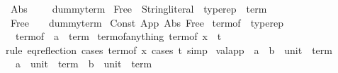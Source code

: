 \begin{isabellebody}
\ \ {\isachardoublequoteopen}Abs\ {\isacharunderscore}{\kern0pt}\ {\isacharunderscore}{\kern0pt}\ {\isacharunderscore}{\kern0pt}\ {\isacharequal}{\kern0pt}\ dummy{\isacharunderscore}{\kern0pt}term{\isachardoublequoteclose}\isanewline
\isanewline
{}\isamarkupfalse%
\ Free\ {\isacharcolon}{\kern0pt}{\isacharcolon}{\kern0pt}\ {\isachardoublequoteopen}String{\isachardot}{\kern0pt}literal\ {\isasymRightarrow}\ typerep\ {\isasymRightarrow}\ term{\isachardoublequoteclose}\ \isanewline
\ \ {\isachardoublequoteopen}Free\ {\isacharunderscore}{\kern0pt}\ {\isacharunderscore}{\kern0pt}\ {\isacharequal}{\kern0pt}\ dummy{\isacharunderscore}{\kern0pt}term{\isachardoublequoteclose}\isanewline
\isanewline
{}\isamarkupfalse%
\ Const\ App\ Abs\ Free\isanewline
\isanewline
{}\isamarkupfalse%
\ term{\isacharunderscore}{\kern0pt}of\ {\isacharequal}{\kern0pt}\ typerep\ {\isacharplus}{\kern0pt}\isanewline
\ \ \ term{\isacharunderscore}{\kern0pt}of\ {\isacharcolon}{\kern0pt}{\isacharcolon}{\kern0pt}\ {\isachardoublequoteopen}{\isacharprime}{\kern0pt}a\ {\isasymRightarrow}\ term{\isachardoublequoteclose}\isanewline
\isanewline
{}\isamarkupfalse%
\ term{\isacharunderscore}{\kern0pt}of{\isacharunderscore}{\kern0pt}anything{\isacharcolon}{\kern0pt}\ {\isachardoublequoteopen}term{\isacharunderscore}{\kern0pt}of\ x\ {\isasymequiv}\ t{\isachardoublequoteclose}\isanewline
%
\isadelimproof
\ \ %
\endisadelimproof
%
\isatagproof
{}\isamarkupfalse%
\ {\isacharparenleft}{\kern0pt}rule\ eq{\isacharunderscore}{\kern0pt}reflection{\isacharparenright}{\kern0pt}\ {\isacharparenleft}{\kern0pt}cases\ {\isachardoublequoteopen}term{\isacharunderscore}{\kern0pt}of\ x{\isachardoublequoteclose}{\isacharcomma}{\kern0pt}\ cases\ t{\isacharcomma}{\kern0pt}\ simp{\isacharparenright}{\kern0pt}%
\endisatagproof
{\isafoldproof}%
%
\isadelimproof
\isanewline
%
\endisadelimproof
\isanewline
{}\isamarkupfalse%
\ valapp\ {\isacharcolon}{\kern0pt}{\isacharcolon}{\kern0pt}\ {\isachardoublequoteopen}{\isacharparenleft}{\kern0pt}{\isacharprime}{\kern0pt}a\ {\isasymRightarrow}\ {\isacharprime}{\kern0pt}b{\isacharparenright}{\kern0pt}\ {\isasymtimes}\ {\isacharparenleft}{\kern0pt}unit\ {\isasymRightarrow}\ term{\isacharparenright}{\kern0pt}\isanewline
\ \ {\isasymRightarrow}\ {\isacharprime}{\kern0pt}a\ {\isasymtimes}\ {\isacharparenleft}{\kern0pt}unit\ {\isasymRightarrow}\ term{\isacharparenright}{\kern0pt}\ {\isasymRightarrow}\ {\isacharprime}{\kern0pt}b\ {\isasymtimes}\ {\isacharparenleft}{\kern0pt}unit\ {\isasymRightarrow}\ term{\isacharparenright}{\kern0pt}{\isachardoublequoteclose}\ \isanewline

\end{isabellebody}
